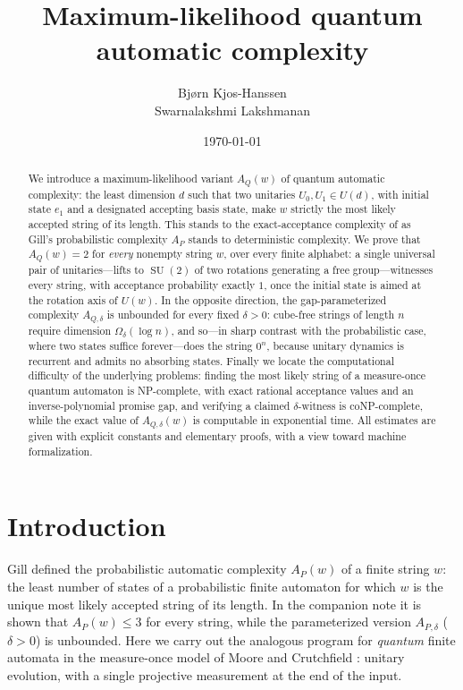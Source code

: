 \documentclass[11pt]{amsart}
\title[Maximum-likelihood quantum automatic complexity]{Maximum-likelihood quantum automatic complexity}
\author{Bj{\o}rn Kjos-Hanssen \\ Swarnalakshmi Lakshmanan}
\date{\today}
\theoremstyle{definition}
\theoremstyle{remark}
\newcommand{\AQ}{A_Q}
\newcommand{\AP}{A_P}
\DeclareMathOperator{\SU}{SU}
\begin{document}
\begin{abstract}
We introduce a maximum-likelihood variant $\AQ(w)$ of quantum automatic
complexity: the least dimension $d$ such that two unitaries
$U_0,U_1\in U(d)$, with initial state $e_1$ and a designated accepting
basis state, make $w$ strictly the most likely accepted string of its
length. This stands to the exact-acceptance complexity of
\cite{KH17} as Gill's probabilistic complexity $\AP$ \cite{Gill24}
stands to deterministic complexity. We prove that $\AQ(w)=2$ for
\emph{every} nonempty string $w$, over every finite alphabet: a single
universal pair of unitaries---lifts to $\SU(2)$ of two rotations
generating a free group---witnesses every string, with acceptance
probability exactly $1$, once the initial state is aimed at the
rotation axis of $U(w)$. In the opposite direction, the
gap-parameterized complexity $A_{Q,\delta}$ is unbounded for every
fixed $\delta>0$: cube-free strings of length $n$ require dimension
$\Omega_\delta(\log n)$, and so---in sharp contrast with the
probabilistic case, where two states suffice forever---does the string
$0^n$, because unitary dynamics is recurrent and admits no absorbing
states. Finally we locate the computational difficulty of the
underlying problems: finding the most likely string of a
measure-once quantum automaton is NP-complete, with exact rational
acceptance values and an inverse-polynomial promise gap, and verifying
a claimed $\delta$-witness is coNP-complete, while the exact value of
$A_{Q,\delta}(w)$ is computable in exponential time. All estimates
are given with explicit constants and elementary proofs, with a view
toward machine formalization.
\end{abstract}

\maketitle

\section{Introduction}

Gill \cite{Gill24} defined the probabilistic automatic complexity
$\AP(w)$ of a finite string $w$: the least number of states of a
probabilistic finite automaton for which $w$ is the unique most likely
accepted string of its length. In the companion note \cite{KHpfa} it
is shown that $\AP(w)\le3$ for every string, while the parameterized
version $A_{P,\delta}$ ($\delta>0$) is unbounded. Here we carry out
the analogous program for \emph{quantum} finite automata in the
measure-once model of Moore and Crutchfield \cite{MC00}: unitary
evolution, with a single projective measurement at the end of the
input.
\end{document}
